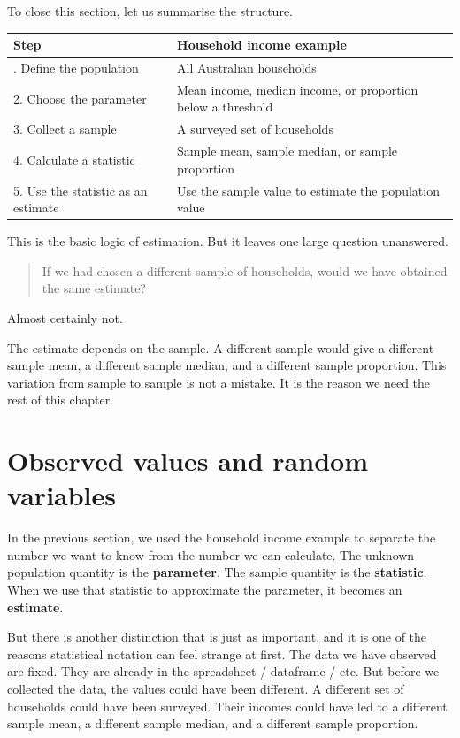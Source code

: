 \documentclass[
  letterpaper,
  DIV=11,
  numbers=noendperiod]{scrreprt}
\begin{document}
To close this section, let us summarise the structure.

\begin{table}
\fontsize{12.0pt}{14.0pt}\selectfont
\begin{tabular*}{\linewidth}{@{\extracolsep{\fill}}ll}
\toprule
Step & Household income example \\ 
\midrule\addlinespace[2.5pt]
1. Define the population & All Australian households \\ 
2. Choose the parameter & Mean income, median income, or proportion below a threshold \\ 
3. Collect a sample & A surveyed set of households \\ 
4. Calculate a statistic & Sample mean, sample median, or sample proportion \\ 
5. Use the statistic as an estimate & Use the sample value to estimate the population value \\ 
\bottomrule
\end{tabular*}
\end{table}

This is the basic logic of estimation. But it leaves one large question
unanswered.

\begin{quote}
If we had chosen a different sample of households, would we have
obtained the same estimate?
\end{quote}

Almost certainly not.

The estimate depends on the sample. A different sample would give a
different sample mean, a different sample median, and a different sample
proportion. This variation from sample to sample is not a mistake. It is
the reason we need the rest of this chapter.

\section{Observed values and random
variables}\label{observed-values-and-random-variables}

In the previous section, we used the household income example to
separate the number we want to know from the number we can calculate.
The unknown population quantity is the \textbf{parameter}. The sample
quantity is the \textbf{statistic}. When we use that statistic to
approximate the parameter, it becomes an \textbf{estimate}.

But there is another distinction that is just as important, and it is
one of the reasons statistical notation can feel strange at first. The
data we have observed are fixed. They are already in the spreadsheet /
dataframe / etc. But before we collected the data, the values could have
been different. A different set of households could have been surveyed.
Their incomes could have led to a different sample mean, a different
sample median, and a different sample proportion.
\end{document}
